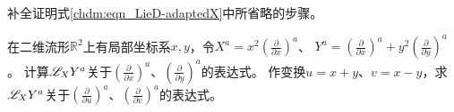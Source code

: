 \begin{exercise}
	补全证明式\eqref{chdm:eqn_LieD-adaptedX}中所省略的步骤。
\end{exercise}

\begin{exercise}
	在二维流形$\mathbb{R}^2$上有局部坐标系$x,y$，令$X^a = x^2 (\frac{\partial}{\partial x})^a$、
	$Y^a = (\frac{\partial}{\partial x})^a + y^2 (\frac{\partial}{\partial y})^a$。
	计算$\mathscr{L}_X Y^a$关于$(\frac{\partial}{\partial x})^a$、$(\frac{\partial}{\partial y})^a$的表达式。
	作变换$u=x+y$、$v=x-y$，求$\mathscr{L}_X Y^a$关于$(\frac{\partial}{\partial u})^a$、$(\frac{\partial}{\partial v})^a$的表达式。
\end{exercise}
